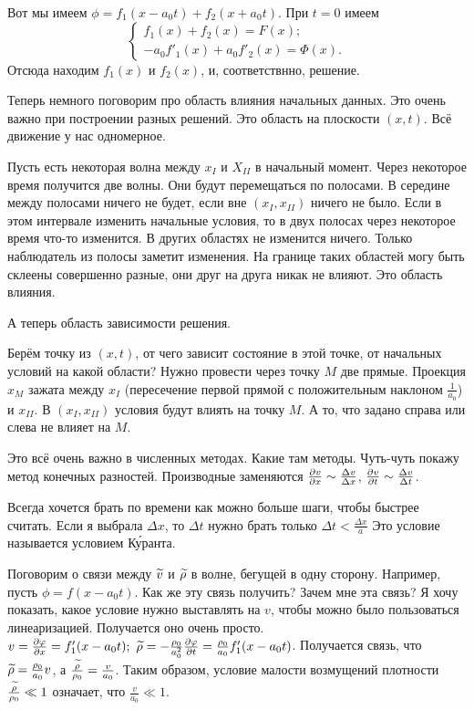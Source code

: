 Вот мы имеем $\phi = f_1(x-a_0t) + f_2(x+a_0t)$. При $t=0 $ имеем 
\[\begin{cases}
	f_1(x) + f_2(x) = F(x);\\
	-a_0 f'_1(x) + a_0f'_2(x) = \Phi(x).
	\end{cases}
\]
Отсюда находим $f_1(x)$ и $f_2(x)$, и, соответствнно, решение.

Теперь немного поговорим про область влияния начальных данных. Это очень важно при построении разных решений. Это область на плоскости $(x,t)$. Всё движение у нас одномерное.

Пусть есть некоторая волна между $x_I$ и $X_{II}$ в начальный момент. Через некоторое время получится две волны. Они будут перемещаться по полосами. В середине между полосами ничего не будет, если вне $(x_I,x_{II})$ ничего не было. Если в этом интервале изменить начальные условия, то в двух полосах через некоторое время что-то изменится. В других областях не изменится ничего. Только наблюдатель из полосы заметит изменения. На границе таких областей могу быть склеены совершенно разные, они друг на друга никак не влияют. Это область влияния.

А теперь область зависимости решения.

Берём точку из $(x,t)$, от чего зависит состояние в этой точке, от начальных условий на какой области? Нужно провести через точку $M$ две прямые. Проекция $x_M$ зажата между $x_I$ (пересечение первой прямой с положительным наклоном $\frac1{a_0}$) и $x_{II}$. В $(x_{I},x_{II})$ условия будут влиять на точку $M$. А то, что задано справа или слева не влияет на $M$.

Это всё очень важно в численных методах. Какие там методы. Чуть-чуть покажу метод конечных разностей. Производные заменяются $\frac{\partial v}{\partial x}\sim\frac{\Delta v}{\Delta x}$, $\frac{\partial v}{\partial t}\sim\frac{\Delta v}{\Delta t}$.

Всегда хочется брать по времени как можно больше шаги, чтобы быстрее считать. Если я выбрала $\Delta x$, то $\Delta t$ нужно брать только $\Delta t<\frac{\Delta x}a$
Это условие называется условием К\'{у}ранта.

Поговорим о связи между $\widetilde{v}{}$ и $\widetilde{\rho}{}$ в волне, бегущей в одну сторону. Например, пусть $\phi = f(x-a_0t)$.
Как же эту связь получить? Зачем мне эта связь? Я хочу показать, какое условие нужно выставлять на $v$, чтобы можно было пользоваться линеаризацией.
Получается оно очень просто.
$v = \CP\phi x = f'_1(x-a_0t);\ 
\Til \rho = -\frac{\rho_0}{a_0^2}\CP\phi t = \frac{\rho_0}{a_0}f'_1(x-a_0t)$. Получается связь, что $\widetilde{\rho}{} = \frac{\rho_0}{a_0} v$, а $\frac{\widetilde{\rho}{}}{\rho_0} = \frac{v}{a_0}$. Таким образом, условие малости возмущений плотности $\frac{\widetilde{\rho}{}}{\rho_0}\ll1$ означает, что $\frac v{a_0}\ll1$.

